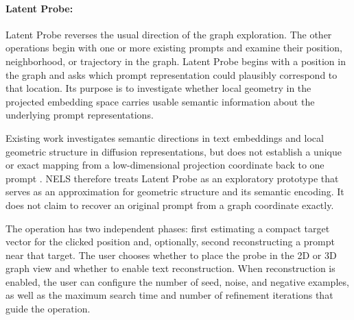 \paragraph{Latent Probe:} Latent Probe reverses the usual direction of the graph exploration. The other operations begin with one or more existing prompts and examine their position, neighborhood, or trajectory in the graph. Latent Probe begins with a position in the graph and asks which prompt representation could plausibly correspond to that location. Its purpose is to investigate whether local geometry in the projected embedding space carries usable semantic information about the underlying prompt representations.

Existing work investigates semantic directions in text embeddings and local geometric structure in diffusion representations, but does not establish a unique or exact mapping from a low-dimensional projection coordinate back to one prompt \cite{yu2024textembedding,park2023riemannian,kwon2023semantic}. NELS therefore treats Latent Probe as an exploratory prototype that serves as an approximation for geometric structure and its semantic encoding. It does not claim to recover an original prompt from a graph coordinate exactly.

The operation has two independent phases: first estimating a compact target vector for the clicked position and, optionally, second reconstructing a prompt near that target. The user chooses whether to place the probe in the 2D or 3D graph view and whether to enable text reconstruction. When reconstruction is enabled, the user can configure the number of seed, noise, and negative examples, as well as the maximum search time and number of refinement iterations that guide the operation.

